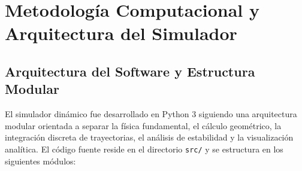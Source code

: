 \chapter{Metodología Computacional y Arquitectura del Simulador}

\section{Arquitectura del Software y Estructura Modular}
El simulador dinámico fue desarrollado en Python 3 siguiendo una arquitectura modular orientada a separar la física fundamental, el cálculo geométrico, la integración discreta de trayectorias, el análisis de estabilidad y la visualización analítica. El código fuente reside en el directorio \texttt{src/} y se estructura en los siguientes módulos:

